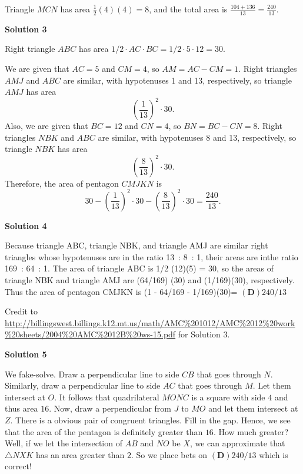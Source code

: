 \begin{enumerate}
 Triangle $MCN$ has area $\frac{1}{2}(4)(4)=8$, and the total area is $\frac{104+136}{13}=\boxed{\frac{240}{13}}$.

 



\textbf{Solution 3}

Right triangle $ABC$ has area $1/2 \cdot AC \cdot BC = 1/2 \cdot 5 \cdot 12 = 30$.

 We are given that $AC = 5$ and $CM = 4$, so $AM = AC - CM = 1$. Right triangles $AMJ$ and $ABC$ are similar, with hypotenuses 1 and 13, respectively, so triangle $AMJ$ has area
 \[\left( \frac{1}{13} \right)^2 \cdot 30.\]Also, we are given that $BC = 12$ and $CN = 4$, so $BN = BC - CN = 8$. Right triangles $NBK$ and $ABC$ are similar, with hypotenuses 8 and 13, respectively, so triangle $NBK$ has area
 \[\left( \frac{8}{13} \right)^2 \cdot 30.\]Therefore, the area of pentagon $CMJKN$ is
 \[30 - \left( \frac{1}{13} \right)^2 \cdot 30 - \left( \frac{8}{13} \right)^2 \cdot 30 = \boxed{\frac{240}{13}}.\]




\textbf{Solution 4}

Because triangle ABC, triangle NBK, and triangle AMJ are similar right triangles whose hypotenuses are in the ratio 13 : 8 : 1, their areas are inthe ratio 169 : 64 : 1. The area of triangle ABC is 1/2 (12)(5) = 30, so the areas of triangle NBK and triangle AMJ are (64/169) (30) and (1/169)(30), respectively. Thus the area of pentagon CMJKN is (1 -  64/169 - 1/169)(30)= $\boxed{\mathbf{(D)}240/13}$

 Credit to \href{https://artofproblemsolving.comhttp://billingswest.billings.k12.mt.us/math/AMC\%201012/AMC\%2012\%20work\%20sheets/2004\%20AMC\%2012B\%20ws-15.pdf}{http://billingswest.billings.k12.mt.us/math/AMC\%201012/AMC\%2012\%20work\%20sheets/2004\%20AMC\%2012B\%20ws-15.pdf} for Solution 3.

 



\textbf{Solution 5}

We fake-solve. Draw a perpendicular line to side $CB$ that goes through $N$. Similarly, draw a perpendicular line to side $AC$ that goes through $M$. Let them intersect at $O$. It follows that quadrilateral $MONC$ is a square with side $4$ and thus area $16$. Now, draw a perpendicular from $J$ to $MO$ and let them intersect at $Z$. There is a obvious pair of congruent triangles. Fill in the gap. Hence, we see that the area of the pentagon is definitely greater than $16$. How much greater? Well, if we let the intersection of $AB$ and $NO$ be $X$, we can approximate that $\triangle NXK$ has an area greater than $2$. So we place bets on $\boxed{\mathbf{(D)}240/13}$ which is correct!


\end{enumerate}
